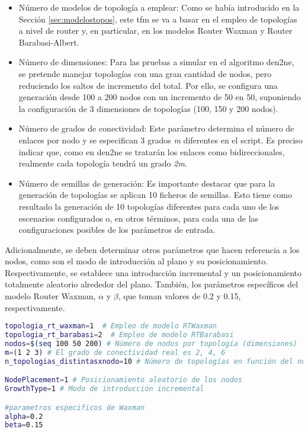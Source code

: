 \begin{itemize}
    \item Número de modelos de topología a emplear: Como se había introducido en la Sección \ref{sec:modelostopos}, este \gls{tfm} se va a basar en el empleo de topologías a nivel de router y, en particular, en los modelos Router Waxman y Router Barabasi-Albert. 
    \item Número de dimensiones: Para las pruebas a simular en el algoritmo \gls{den2ne}, se pretende manejar topologías con una gran cantidad de nodos, pero reduciendo los saltos de incremento del total. Por ello, se configura una generación desde 100 a 200 nodos con un incremento de 50 en 50, suponiendo la configuración de 3 dimensiones de topologías (100, 150 y 200 nodos). 
    \item Número de grados de conectividad: Este parámetro determina el número de enlaces por nodo y se especifican 3 grados \textit{m} diferentes en el script. Es preciso indicar que, como en \gls{den2ne} se tratarán los enlaces como bidireccionales, realmente cada topología tendrá un grado \textit{2m}.
    \item Número de semillas de generación: Es importante destacar que para la generación de topologías se aplican 10 ficheros de semillas. Esto tiene como resultado la generación de 10 topologías diferentes para cada uno de los escenarios configurados o, en otros términos, para cada una de las configuraciones posibles de los parámetros de entrada.
\end{itemize}

\vspace{3mm}
\pagebreak

Adicionalmente, se deben determinar otros parámetros que hacen referencia a los nodos, como son el modo de introducción al plano y su posicionamiento. Respectivamente, se establece una introducción incremental y un posicionamiento totalmente aleatorio alrededor del plano. También, los parámetros específicos del modelo Router Waxman, $\alpha$ y $\beta$, que toman valores de 0.2 y 0.15, respectivamente.

\vspace{3mm}

\begin{lstlisting}[language=bash, style=Consola, caption={Configuración de los parámetros de entrada en el script de automatización de \acrshort{brite}}]
topologia_rt_waxman=1  # Empleo de modelo RTWaxman
topologia_rt_barabasi=2  # Empleo de modelo RTBarabasi
nodos=$(seq 100 50 200) # Número de nodos por topología (dimensiones)
m=(1 2 3) # El grado de conectividad real es 2, 4, 6
n_topologias_distintasxnodo=10 # Número de topologías en función del número de semillas

NodePlacement=1 # Posicionamiento aleatorio de los nodos
GrowthType=1 # Modo de introducción incremental

#parametros especificos de Waxman
alpha=0.2
beta=0.15
\end{lstlisting}

